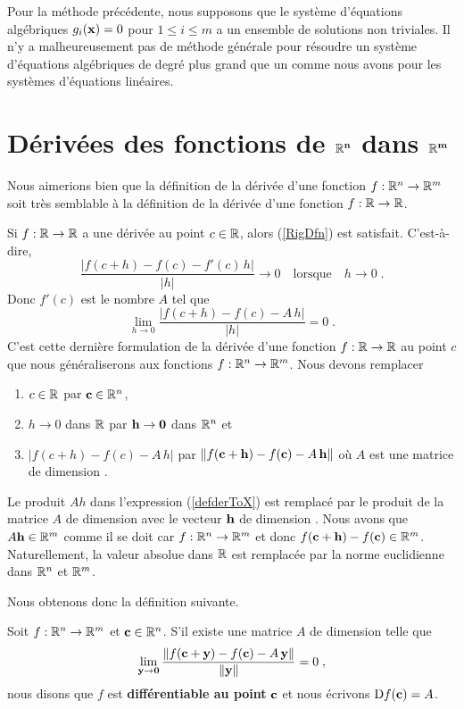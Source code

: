 {Pour la méthode précédente, nous supposons que le système d'équations
algébriques $g_i(\mathbf{x}) =0$ pour $1 \leq i \leq m$ a un ensemble de
solutions non triviales.  Il n'y a malheureusement pas de méthode
générale pour résoudre un système d'équations algébriques de degré
plus grand que un comme nous avons pour les systèmes d'équations linéaires.

\section{Dérivées des fonctions de $\mathbf{\mathbb{R}^n}$ dans
  $\mathbf{\mathbb{R}^m}$ \theory \life}

Nous aimerions bien que la définition de la dérivée d'une fonction
$f:\mathbb{R}^n\rightarrow \mathbb{R}^m$ soit très semblable à la définition de la dérivée
d'une fonction $f:\mathbb{R}\rightarrow \mathbb{R}$.

Si $f:\mathbb{R}\rightarrow \mathbb{R}$ a une dérivée au point $c\in \mathbb{R}$, alors
(\ref{RigDfn}) est satisfait.  C'est-à-dire,
\[
\frac{|f(c+h)-f(c)-f'(c)\,h|}{|h|} \rightarrow 0 \quad \text{lorsque} \quad
h\rightarrow 0 \; .
\]
Donc $f'(c)$ est le nombre $A$ tel que
\begin{equation}\label{defderToX}
\lim_{h\rightarrow 0} \frac{|f(c+h)-f(c)-A\,h|}{|h|} = 0 \; .
\end{equation}
C'est cette dernière formulation de la dérivée d'une fonction
$f:\mathbb{R}\rightarrow \mathbb{R}$ au point $c$ que nous généraliserons aux fonctions
$f:\mathbb{R}^n\rightarrow \mathbb{R}^m$.  Nous devons remplacer
\begin{enumerate}
\item $c\in \mathbb{R}$ par $\mathbf{c} \in \mathbb{R}^n$,
\item $h\rightarrow 0$ dans $\mathbb{R}$ par $\mathbf{h} \rightarrow \mathbf{0}$
dans $\mathbb{R}^n$ et
\item $|f(c+h)-f(c)-A\,h|$ par
$\|f(\mathbf{c}+\mathbf{h})-f(\mathbf{c})-A\,\mathbf{h}\|$ où $A$ est une matrice
de dimension .
\end{enumerate}
Le produit $Ah$ dans l'expression (\ref{defderToX}) est remplacé
par le produit de la matrice $A$ de dimension  avec le
vecteur $\mathbf{h}$ de dimension .
Nous avons que $A \mathbf{h} \in \mathbb{R}^m$
comme il se doit car $f:\mathbb{R}^n \to \mathbb{R}^m$ et donc 
$f(\mathbf{c}+\mathbf{h})-f(\mathbf{c}) \in \mathbb{R}^m$.  Naturellement, la valeur
absolue dans $\mathbb{R}$ est remplacée par la norme euclidienne dans $\mathbb{R}^n$
et $\mathbb{R}^m$.

Nous obtenons donc la définition suivante.

\begin{focus}{\dfn} 
Soit $f:\mathbb{R}^n\rightarrow \mathbb{R}^m$ et $\mathbf{c} \in \mathbb{R}^n$.  S'il existe
une matrice $A$ de dimension  telle que
\begin{equation}\label{defderRNRM}
\lim_{\mathbf{y}\rightarrow \mathbf{0}}
\frac{\|f(\mathbf{c}+\mathbf{y})-f(\mathbf{c})- A\,\mathbf{y}\|}{\|\mathbf{y}\|} = 0\; ,
\end{equation}
nous disons que $f$ est {\bfseries différentiable au point} $\mathbf{c}$ et
nous écrivons $\mathrm{D} f(\mathbf{c}) = A$.
\end{focus}

}
